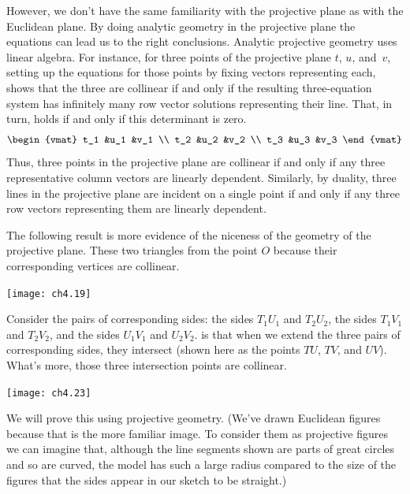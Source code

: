 However, we don't have the same familiarity with the projective plane as
with the Euclidean plane.
By doing analytic geometry in the projective plane the equations can 
lead us to the right conclusions.
Analytic projective geometry uses linear algebra.
For instance, for three points of the projective plane
$t$, $u$, and~$v$, 
setting up the equations for those points by fixing vectors representing each,
shows that the three are collinear if and only if the resulting three-equation
system has infinitely many row vector solutions
representing their line.
That, in turn, holds if and only if this determinant is zero.
\begin{equation*}
  \begin{vmat}
    t_1  &u_1  &v_1  \\
    t_2  &u_2  &v_2  \\
    t_3  &u_3  &v_3  
  \end{vmat}
\end{equation*}
Thus, three points in the projective plane are collinear if and only if
any three representative column vectors are linearly dependent.
Similarly, by duality, 
three lines in the projective plane are incident on a single
point if and only if any three row vectors representing them are linearly
dependent.

The following result is more evidence of the niceness
of the geometry of the projective plane.
These two triangles 
 from the point $O$ 
because their corresponding vertices are collinear.
\begin{center}
  \texttt{[image: ch4.19]}
\end{center}
Consider the pairs of corresponding sides:
the sides $T_1U_1$ and $T_2U_2$, 
the sides $T_1V_1$ and $T_2V_2$, 
and the sides $U_1V_1$ and $U_2V_2$.
is that when we extend the three pairs of corresponding 
sides, they intersect
(shown here as the points $TU$, $TV$, and $UV$).
What's more, those three intersection points are collinear.
\begin{center}
  \texttt{[image: ch4.23]}
\end{center}
We will prove this using projective geometry.
(We've drawn Euclidean figures because that is the more familiar image.
To consider them as projective figures
we can imagine that, although the line segments shown are parts of great 
circles and so are curved,
the model has such a large radius compared to the size of the 
figures that the sides appear in our sketch to be straight.)

